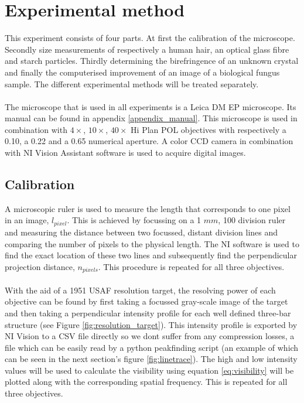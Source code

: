 \section{Experimental method}

This experiment consists of four parts. At first the calibration of the microscope. Secondly size measurements of respectively a human hair, an optical glass fibre and starch particles. Thirdly determining the birefringence of an unknown crystal and finally the computerised improvement of an image of a biological fungus sample. The different experimental methods will be treated separately.\\
\\
The microscope that is used in all experiments is a Leica DM EP microscope. Its manual can be found in appendix \ref{appendix_manual}. This microscope is used in combination with $4\times$, $10\times$, $40\times$ Hi Plan POL objectives with respectively a 0.10, a 0.22 and a 0.65 numerical aperture. A color CCD camera in combination with NI Vision Assistant software is used to acquire digital images.

\subsection{Calibration}
\label{expmeth_calibration}

A microscopic ruler is used to measure the length that corresponds to one pixel in an image, $l_{pixel}$. This is achieved by focussing on a 1 $mm$, 100 division ruler and measuring the distance between two focussed, distant division lines and comparing the number of pixels to the physical length. The NI software is used to find the exact location of these two lines and subsequently find the perpendicular projection distance, $n_{pixels}$. This procedure is repeated for all three objectives.\\
\\
With the aid of a 1951 USAF resolution target, the resolving power of each objective can be found by first taking a focussed gray-scale image of the target and then taking a perpendicular intensity profile for each well defined three-bar structure (see Figure \ref{fig:resolution_target}). This intensity profile is exported by NI Vision to a CSV file directly so we dont suffer from any compression losses, a file which can be easily read by a python peakfinding script (an example of which can be seen in the next section's figure \ref{fig:linetrace}). The high and low intensity values will be used to calculate the visibility using equation \ref{eq:visibility} will be plotted along with the corresponding spatial frequency. This is repeated for all three objectives.\\


